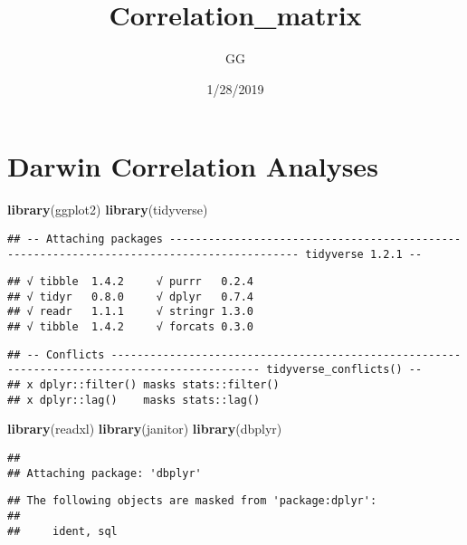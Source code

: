 \documentclass[]{article}
\title{Correlation\_matrix}
\author{GG}
\date{1/28/2019}
\newenvironment{Shaded}{\begin{snugshade}}{\end{snugshade}}
\newcommand{\KeywordTok}[1]{\textcolor[rgb]{0.13,0.29,0.53}{\textbf{#1}}}
\newcommand{\NormalTok}[1]{#1}
\begin{document}
\maketitle

\section{Darwin Correlation Analyses}\label{darwin-correlation-analyses}

\begin{Shaded}
\begin{Highlighting}[]
\KeywordTok{library}\NormalTok{(ggplot2)}
\KeywordTok{library}\NormalTok{(tidyverse)}
\end{Highlighting}
\end{Shaded}

\begin{verbatim}
## -- Attaching packages ------------------------------------------------------------------------------------------ tidyverse 1.2.1 --
\end{verbatim}

\begin{verbatim}
## √ tibble  1.4.2     √ purrr   0.2.4
## √ tidyr   0.8.0     √ dplyr   0.7.4
## √ readr   1.1.1     √ stringr 1.3.0
## √ tibble  1.4.2     √ forcats 0.3.0
\end{verbatim}

\begin{verbatim}
## -- Conflicts --------------------------------------------------------------------------------------------- tidyverse_conflicts() --
## x dplyr::filter() masks stats::filter()
## x dplyr::lag()    masks stats::lag()
\end{verbatim}

\begin{Shaded}
\begin{Highlighting}[]
\KeywordTok{library}\NormalTok{(readxl)}
\KeywordTok{library}\NormalTok{(janitor)}
\KeywordTok{library}\NormalTok{(dbplyr)}
\end{Highlighting}
\end{Shaded}

\begin{verbatim}
## 
## Attaching package: 'dbplyr'
\end{verbatim}

\begin{verbatim}
## The following objects are masked from 'package:dplyr':
## 
##     ident, sql
\end{verbatim}
\end{document}
